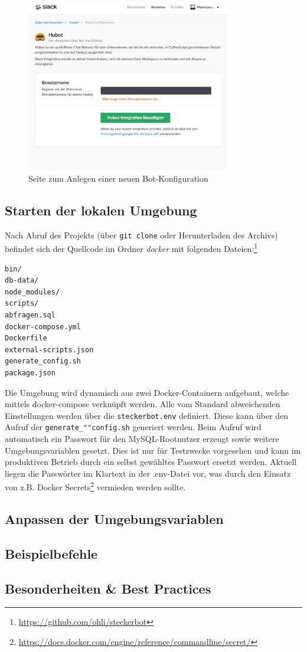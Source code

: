 \begin{figure}[H]
    \centering
    \includegraphics[width=0.8\textwidth]{img/hubot-int.png}
    \caption{Seite zum Anlegen einer neuen Bot-Konfiguration}
    \label{img:hubot-int}
\end{figure}

\subsection{Starten der lokalen Umgebung}
Nach Abruf des Projekts (über \verb+git clone+ oder Herunterladen des Archivs) befindet sich der Quellcode im Ordner \textit{docker} mit folgenden Dateien:\footnote{\url{https://github.com/ohli/steckerbot}}

\begin{verbatim}
bin/
db-data/
node_modules/
scripts/
abfragen.sql
docker-compose.yml
Dockerfile
external-scripts.json
generate_config.sh
package.json
\end{verbatim}

Die Umgebung wird dynamisch aus zwei Docker-Containern aufgebaut, welche mittels docker-compose verknüpft werden. Alle vom Standard abweichenden Einstellungen werden über die \texttt{steckerbot.env} definiert. Diese kann über den Aufruf der \texttt{generate\_""config.sh} generiert werden. Beim Aufruf wird automatisch ein Passwort für den MySQL-Rootnutzer erzeugt sowie weitere Umgebungsvariablen gesetzt. Dies ist nur für Testzwecke vorgesehen und kann im produktiven Betrieb durch ein selbst gewähltes Passwort ersetzt werden. Aktuell liegen die Passwörter im Klartext in der .env-Datei vor, was durch den Einsatz von z.B. Docker Secrets\footnote{\url{https://docs.docker.com/engine/reference/commandline/secret/}} vermieden werden sollte.

\subsection{Anpassen der Umgebungsvariablen}

\subsection{Beispielbefehle}

\subsection{Besonderheiten \& Best Practices}
